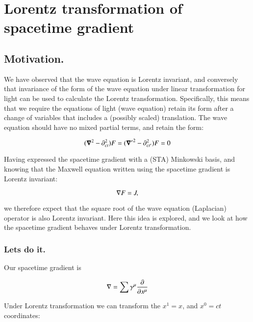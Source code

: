 
\chapter{ Lorentz transformation of spacetime gradient}

\section{Motivation. }

We have observed that the wave equation is Lorentz invariant, and conversely that invariance of the form of the wave equation under linear transformation for light can be used to calculate the Lorentz transformation.  Specifically, this means that we require the equations of light (wave equation) retain its form after a change of variables that includes
a (possibly scaled) translation.  The wave equation should have no mixed partial terms, and retain the form:

\begin{equation*}
(\boldsymbol{\nabla}^2 - \partial_{ct}^2) F = ({\boldsymbol{\nabla}'}^2 - \partial_{ct'}^2) F = 0
\end{equation*}

Having expressed the spacetime gradient with a (STA) Minkowski basis, and knowing that the Maxwell equation written using the spacetime gradient is Lorentz invariant:

\begin{equation*}
\nabla F = J,
\end{equation*}

we therefore expect that the square root of the wave equation (Laplacian) operator is also Lorentz invariant.  Here this idea is explored, and we look at how the spacetime
gradient behaves under Lorentz transformation.

\subsection{Lets do it. }

Our spacetime gradient is

\begin{equation*}
\nabla = \sum \gamma^{\mu} \frac{\partial}{\partial x^{\mu}}
\end{equation*}

Under Lorentz transformation we can transform the $x^1=x$, and $x^0 = ct$ coordinates:

